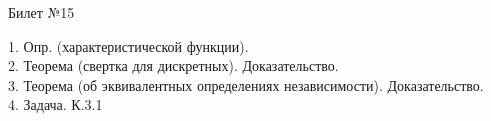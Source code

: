 \documentclass[preview]{standalone}
\begin{document}
 
\begin{center} {\Large Билет №15} \end{center} 

1.  Опр. (характеристической функции).\\

2.  Теорема (свертка для дискретных).  Доказательство.\\

3.  Теорема (об эквивалентных определениях независимости). Доказательство.\\

4. Задача. К.3.1\\
\end{document}
